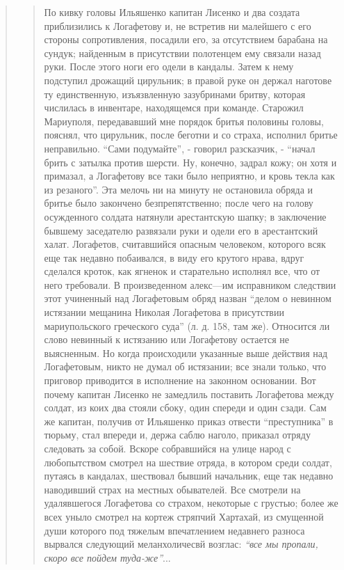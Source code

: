 \begin{quote}
\begin{quote}
По кивку головы Ильяшенко капитан Лисенко и два
создата приблизились к Логафетову и, не встретив ни
малейшего с его стороны сопротивления, посадили его, за
отсутствием барабана на сундук; найденным в присутствии полотенцем
ему связали назад руки. После этого
ноги его одели в кандалы. Затем к нему подступил
дрожащий цирульник; в правой руке он держал наготове 
ту единственную, изъязвленную зазубринами бритву,
которая числилась в инвентаре, находящемся при команде.
Старожил Мариуполя, передававший мне порядок бритья
половины головы, пояснял, что цирульник, после беготни
и со страха, исполнил бритье неправильно. 
``Сами подумайте'', - говорил разсказчик, -  ``начал брить с затылка
против шерсти. Ну, конечно, задрал кожу; он хотя и
примазал, а Логафетову все таки было неприятно, и кровь
текла как из резаного''. Эта мелочь ни на минуту не
остановила обряда и бритье было закончено безпрепятственно;
после чего на голову осужденного солдата натянули арестантскую шапку; 
в заключение бывшему заседателю развязали руки и одели его в арестантский халат. Логафетов,
считавшийся опасным человеком, которого всяк еще так
недавно побаивался, в виду его крутого нрава, вдруг сделался
кроток, как ягненок и старательно исполнял все,
что от него требовали. В произведенном алекс—им исправником 
следствии этот учиненный над Логафетовым
обряд назван ``делом о невинном истязании мещанина
Николая Логафетова в присутствии мариупольского греческого
суда'' (л. д. 158, там же). Относится ли слово невинный
к истязанию или Логафетову остается не выясненным. Но
когда происходили указанные выше действия над Логафетовым, 
никто не думал об истязании; все знали только,
что приговор приводится в исполнение на законном основании. 
Вот почему капитан Лисенко не замедлиль поставить Логафетова между солдат, из коих два стояли
сбоку, один спереди и один сзади. 
Сам же капитан, получив от Ильяшенко приказ отвести ``преступника'' в
тюрьму, стал впереди и, держа саблю наголо, приказал
отряду следовать за собой. Вскоре собравшийся на улице
народ с любопытством смотрел на шествие отряда, в
котором среди солдат, путаясь в кандалах, шествовал
бывший начальник, еще так недавно наводивший страх
на местных обывателей. Все смотрели на удалявшегося Логафетова со страхом,
некоторые с грустью; более же всех
уныло смотрел на кортеж стряпчий Хартахай, из смущенной души которого 
под тяжелым впечатлением недавнего
разноса вырвался следующий меланхоличесвй возглас: \emph{``все
мы пропали, скоро все пойдем туда-же''}...


\end{quote}
\end{quote}
